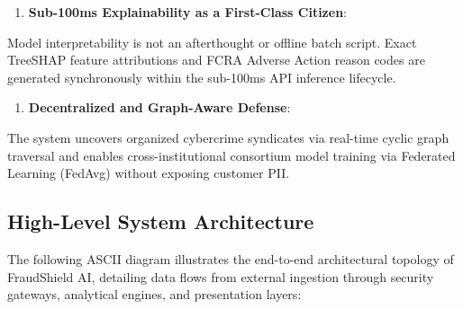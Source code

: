 \documentclass[12pt,a4paper,oneside]{report}
\begin{document}
\begin{enumerate}[leftmargin=0.35in]
\item \textbf{Sub-100ms Explainability as a First-Class Citizen}:
\end{enumerate}
Model interpretability is not an afterthought or offline batch script. Exact TreeSHAP feature attributions and FCRA Adverse Action reason codes are generated synchronously within the sub-100ms API inference lifecycle.

\begin{enumerate}[leftmargin=0.35in]
\item \textbf{Decentralized and Graph-Aware Defense}:
\end{enumerate}
The system uncovers organized cybercrime syndicates via real-time cyclic graph traversal and enables cross-institutional consortium model training via Federated Learning (FedAvg) without exposing customer PII.



\subsection{High-Level System Architecture}

The following ASCII diagram illustrates the end-to-end architectural topology of FraudShield AI, detailing data flows from external ingestion through security gateways, analytical engines, and presentation layers:
\end{document}
